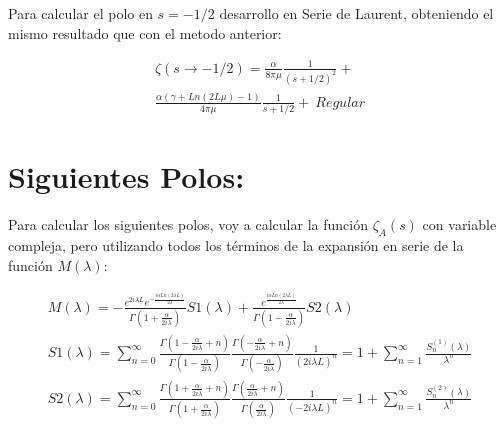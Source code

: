 Para calcular el polo en $s=-1/2$ desarrollo en Serie de Laurent, obteniendo el mismo resultado que con el metodo anterior:

\begin{equation}
\begin{array}{c}

	\zeta (s \rightarrow -1/2) = 
    \frac{\alpha}{8 \pi \mu } \frac{1}{(s+1/2)^2} + \\
	\frac{\alpha ( \gamma  + Ln(2L \mu ) -1 )}{4 \pi \mu } \frac{1}{s+1/2} + \ Regular
    
\end{array}
\label{eq.desarrollo}
\end{equation}



\section{Siguientes Polos:} 

Para calcular los siguientes polos, voy a calcular la función $\zeta _A (s) $ con variable compleja, pero utilizando todos los términos de la expansión en serie de la función $M ( \lambda )$:

\begin{equation}
\begin{array}{c}
M( \lambda ) = 
-
 \frac{e ^{2 i \lambda L } e ^{ - \frac{i \alpha Ln \left( 2 \lambda L \right) }{2 \lambda } }  }
      { \Gamma \left( 1 + \frac{ \alpha}{2 i \lambda}  \right) } S1 ( \lambda ) +
 \frac{ e ^{   \frac{i \alpha Ln \left(2 \lambda L \right) } 
           {2 \lambda } } }
      { \Gamma \left( 1 - \frac{ \alpha}{2 i \lambda}  \right)   } S2 ( \lambda )  \\ [15pt]
      
S1 ( \lambda ) = \sum _{n=0} ^{ \infty }
\frac{\Gamma (1 - \frac{ \alpha}{2 i \lambda} + n )}{\Gamma (1 - \frac{ \alpha}{2 i \lambda})} 
\frac{\Gamma (- \frac{ \alpha}{2 i \lambda} + n )}{\Gamma (- \frac{\alpha}{2 i \lambda})} 
\frac{1}{( 2 i \lambda L ) ^n} = 
1 + \sum _{n=1} ^{\infty} \frac{S ^{(1)} _n (\lambda)}{\lambda ^n} \\ [10pt]

S2 (\lambda ) = \sum _{n=0 } ^{\infty}
\frac{ \Gamma ( 1 + \frac{ \alpha}{2 i \lambda } + n ) }{\Gamma ( 1 + \frac{ \alpha}{2 i \lambda } )}
\frac{\Gamma ( \frac{ \alpha }{2 i \lambda} + n )}{\Gamma ( \frac{ \alpha }{2 i \lambda} )}
\frac{1}{( - 2 i \lambda L ) ^n} = 
1 + \sum _{n=1} ^{\infty} \frac{S ^{(2)} _n (\lambda)}{\lambda ^n}
\end{array}
\label{larga}
\end{equation}

